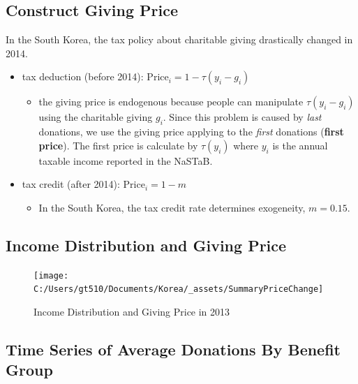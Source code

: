 \documentclass[ review  , 3p ]{elsarticle}
\providecommand{\tightlist}{%
  \setlength{\itemsep}{0pt}\setlength{\parskip}{0pt}}
\begin{document}
  \hypertarget{construct-giving-price}{%
  \subsection{Construct Giving Price}\label{construct-giving-price}}
  
  In the South Korea, the tax policy about charitable giving drastically changed in 2014.
  
  \begin{itemize}
  \tightlist
  \item
    tax deduction (before 2014): \(\text{Price}_i = 1 - \tau(y_i - g_i)\)
  
    \begin{itemize}
    \tightlist
    \item
      the giving price is endogenous because people can manipulate \(\tau(y_i - g_i)\) using the charitable giving \(g_i\). Since this problem is caused by \emph{last} donations, we use the giving price applying to the \emph{first} donations (\textbf{first price}). The first price is calculate by \(\tau(y_i)\) where \(y_i\) is the annual taxable income reported in the NaSTaB.
    \end{itemize}
  \item
    tax credit (after 2014): \(\text{Price}_i = 1 - m\)
  
    \begin{itemize}
    \tightlist
    \item
      In the South Korea, the tax credit rate determines exogeneity, \(m = 0.15\).
    \end{itemize}
  \end{itemize}
  
  \hypertarget{income-distribution-and-giving-price}{%
  \subsection{Income Distribution and Giving Price}\label{income-distribution-and-giving-price}}
  
  \begin{figure}
  
  {\centering \texttt{[image: C:/Users/gt510/Documents/Korea/\_assets/SummaryPriceChange]} 
  
  }
  
  \caption{Income Distribution and Giving Price in 2013}\label{fig:unnamed-chunk-2}
  \end{figure}
  
  \hypertarget{time-series-of-average-donations-by-benefit-group}{%
  \subsection{Time Series of Average Donations By Benefit Group}\label{time-series-of-average-donations-by-benefit-group}}
  
\end{document}
